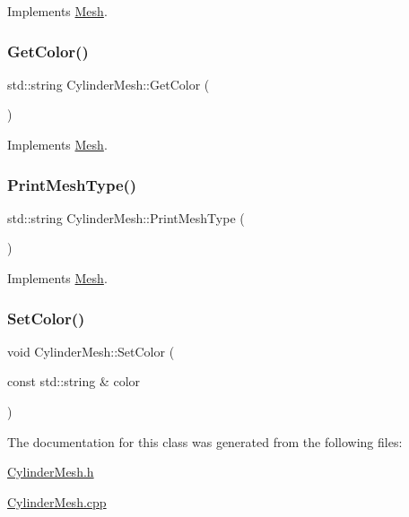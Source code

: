 Implements \mbox{\hyperlink{class_mesh_a11928acab4066671d10e9e531ad96fb6}{Mesh}}.

\mbox{\label{class_cylinder_mesh_a7415f90e56862321e09bcf6088a335a0}} 
\subsubsection{\texorpdfstring{GetColor()}{GetColor()}}
{\footnotesize\ttfamily std\+::string Cylinder\+Mesh\+::\+Get\+Color (\begin{DoxyParamCaption}{ }\end{DoxyParamCaption})\hspace{0.3cm}{\ttfamily [virtual]}}



Implements \mbox{\hyperlink{class_mesh_aa413c0ccbc081aa50a2946e1c6930b0c}{Mesh}}.

\mbox{\label{class_cylinder_mesh_aa5edae04a31b3ccab1e051eba25781a7}} 
\subsubsection{\texorpdfstring{PrintMeshType()}{PrintMeshType()}}
{\footnotesize\ttfamily std\+::string Cylinder\+Mesh\+::\+Print\+Mesh\+Type (\begin{DoxyParamCaption}{ }\end{DoxyParamCaption})\hspace{0.3cm}{\ttfamily [virtual]}}



Implements \mbox{\hyperlink{class_mesh_a0d34fc4317a5e3bc2437b610141b9109}{Mesh}}.

\mbox{\label{class_cylinder_mesh_a892088bc6375fbee9a80b2022b05ea03}} 
\subsubsection{\texorpdfstring{SetColor()}{SetColor()}}
{\footnotesize\ttfamily void Cylinder\+Mesh\+::\+Set\+Color (\begin{DoxyParamCaption}\item[{const std\+::string \&}]{color }\end{DoxyParamCaption})}



The documentation for this class was generated from the following files\+:\begin{DoxyCompactItemize}
\item 
\mbox{\hyperlink{_cylinder_mesh_8h}{Cylinder\+Mesh.\+h}}\item 
\mbox{\hyperlink{_cylinder_mesh_8cpp}{Cylinder\+Mesh.\+cpp}}\end{DoxyCompactItemize}
